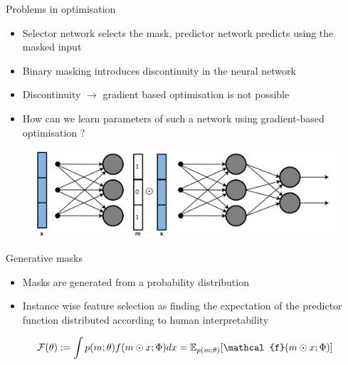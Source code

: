 \documentclass[11pt,compress,t,notes=noshow, aspectratio=169, xcolor=table]{beamer}
\begin{document}
	
\begin{frame}{Problems in optimisation}
    \begin{itemize}
        \item Selector network selects the mask, predictor network predicts using the masked input
        \item Binary masking introduces discontinuity in the neural network
\item Discontinuity $\rightarrow$ gradient based optimisation is not possible
\bigskip
\item How can we learn parameters of such a network using gradient-based optimisation ?
    \end{itemize}
    \begin{figure}
        \centering
        \includegraphics[scale=.43]{bild16}
    \end{figure}
\end{frame}	

\begin{frame}{Generative masks}
    \begin{itemize}
        \item Masks are generated from a probability distribution
        \item Instance wise feature selection as finding the expectation of the predictor function
distributed according to human interpretability
    \end{itemize}
    \bigskip
    \begin{equation*}
             \centering
        \mathcal{F}(\theta):= \int  p(m;\theta) f(m\odot x;\Phi)dx = \mathbb{E}_{p(m;\theta)}[\mathcal{f}(m\odot x;\Phi)]
    \end{equation*}
    
    
    
\end{frame}
	
\end{document}
